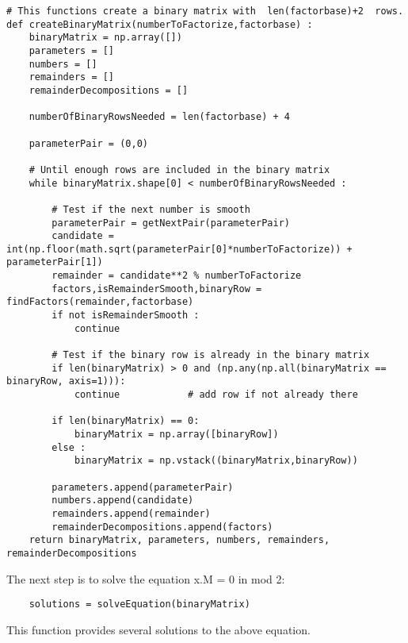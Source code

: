 \documentclass{article}
\begin{document}
\begin{verbatim}
# This functions create a binary matrix with  len(factorbase)+2  rows.
def createBinaryMatrix(numberToFactorize,factorbase) :
    binaryMatrix = np.array([])
    parameters = []
    numbers = []
    remainders = []
    remainderDecompositions = []
    
    numberOfBinaryRowsNeeded = len(factorbase) + 4
    
    parameterPair = (0,0)

    # Until enough rows are included in the binary matrix
    while binaryMatrix.shape[0] < numberOfBinaryRowsNeeded : 
    
        # Test if the next number is smooth
        parameterPair = getNextPair(parameterPair)
        candidate = int(np.floor(math.sqrt(parameterPair[0]*numberToFactorize)) + parameterPair[1])
        remainder = candidate**2 % numberToFactorize
        factors,isRemainderSmooth,binaryRow = findFactors(remainder,factorbase)
        if not isRemainderSmooth :
            continue
    
        # Test if the binary row is already in the binary matrix
        if len(binaryMatrix) > 0 and (np.any(np.all(binaryMatrix == binaryRow, axis=1))):
            continue            # add row if not already there 
    
        if len(binaryMatrix) == 0:
            binaryMatrix = np.array([binaryRow])
        else :
            binaryMatrix = np.vstack((binaryMatrix,binaryRow))
    
        parameters.append(parameterPair)
        numbers.append(candidate)
        remainders.append(remainder)
        remainderDecompositions.append(factors)
    return binaryMatrix, parameters, numbers, remainders, remainderDecompositions
\end{verbatim}

The next step is to solve the equation x.M = 0 in mod 2:
\begin{verbatim}
    solutions = solveEquation(binaryMatrix)
\end{verbatim}

This function provides several solutions to the above equation. 
\end{document}
